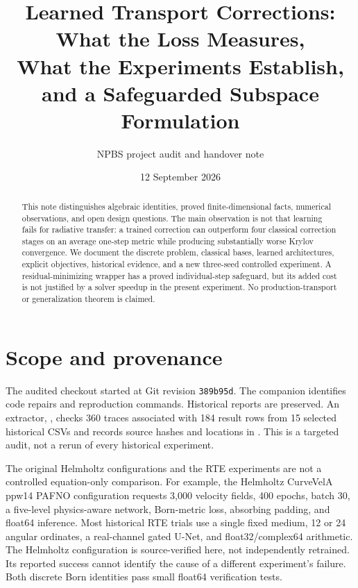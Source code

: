 \documentclass[11pt]{article}
\title{Learned Transport Corrections: What the Loss Measures,\\
What the Experiments Establish, and a Safeguarded Subspace Formulation}
\author{NPBS project audit and handover note}
\date{12 September 2026}
\begin{document}
\maketitle
\begin{abstract}
This note distinguishes algebraic identities, proved finite-dimensional facts,
numerical observations, and open design questions. The main observation is not
that learning fails for radiative transfer: a trained correction can outperform
four classical correction stages on an average one-step metric while producing
substantially worse Krylov convergence. We document the discrete problem,
classical bases, learned architectures, explicit objectives, historical evidence,
and a new three-seed controlled experiment. A residual-minimizing wrapper has a
proved individual-step safeguard, but its added cost is not justified by a solver
speedup in the present experiment. No production-transport or generalization
theorem is claimed.
\end{abstract}

\section{Scope and provenance}
The audited checkout started at Git revision \texttt{389b95d}. The companion
 identifies code repairs and
reproduction commands. Historical reports are preserved. An extractor,
, checks 360 traces associated with
184 result rows from 15 selected historical CSVs and records source hashes and
locations in . This is a targeted
audit, not a rerun of every historical experiment.

The original Helmholtz configurations and the RTE experiments are not a
controlled equation-only comparison. For example, the Helmholtz CurveVelA ppw14
PAFNO configuration requests 3,000 velocity fields, 400 epochs, batch 30, a
five-level physics-aware network, Born-metric loss, absorbing padding, and
float64 inference. Most historical RTE trials use a single fixed medium, 12 or
24 angular ordinates, a real-channel gated U-Net, and float32/complex64 arithmetic.
The Helmholtz configuration is source-verified here, not independently retrained.
Its reported success cannot identify the cause of a different experiment's
failure. Both discrete Born identities pass small float64 verification tests.
\end{document}
